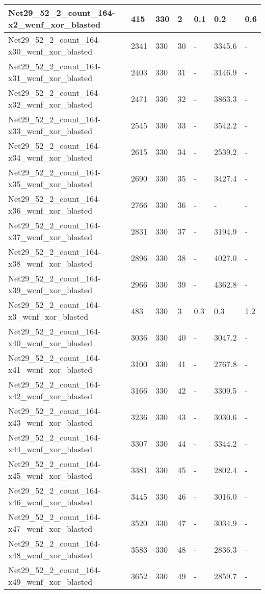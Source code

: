 \begin{scriptsize}
\begin{longtable}{|p{5cm}|l|l|l|l|l|l|}
Net29\_52\_2\_count\_164-x2\_wcnf\_xor\_blasted&415&330&2&0.1&0.2&0.6 \\ \hline 
Net29\_52\_2\_count\_164-x30\_wcnf\_xor\_blasted&2341&330&30&-&3345.6&- \\ \hline 
Net29\_52\_2\_count\_164-x31\_wcnf\_xor\_blasted&2403&330&31&-&3146.9&- \\ \hline 
Net29\_52\_2\_count\_164-x32\_wcnf\_xor\_blasted&2471&330&32&-&3863.3&- \\ \hline 
Net29\_52\_2\_count\_164-x33\_wcnf\_xor\_blasted&2545&330&33&-&3542.2&- \\ \hline 
Net29\_52\_2\_count\_164-x34\_wcnf\_xor\_blasted&2615&330&34&-&2539.2&- \\ \hline 
Net29\_52\_2\_count\_164-x35\_wcnf\_xor\_blasted&2690&330&35&-&3427.4&- \\ \hline 
Net29\_52\_2\_count\_164-x36\_wcnf\_xor\_blasted&2766&330&36&-&-&- \\ \hline 
Net29\_52\_2\_count\_164-x37\_wcnf\_xor\_blasted&2831&330&37&-&3194.9&- \\ \hline 
Net29\_52\_2\_count\_164-x38\_wcnf\_xor\_blasted&2896&330&38&-&4027.0&- \\ \hline 
Net29\_52\_2\_count\_164-x39\_wcnf\_xor\_blasted&2966&330&39&-&4362.8&- \\ \hline 
Net29\_52\_2\_count\_164-x3\_wcnf\_xor\_blasted&483&330&3&0.3&0.3&1.2 \\ \hline 
Net29\_52\_2\_count\_164-x40\_wcnf\_xor\_blasted&3036&330&40&-&3047.2&- \\ \hline 
Net29\_52\_2\_count\_164-x41\_wcnf\_xor\_blasted&3100&330&41&-&2767.8&- \\ \hline 
Net29\_52\_2\_count\_164-x42\_wcnf\_xor\_blasted&3166&330&42&-&3309.5&- \\ \hline 
Net29\_52\_2\_count\_164-x43\_wcnf\_xor\_blasted&3236&330&43&-&3030.6&- \\ \hline 
Net29\_52\_2\_count\_164-x44\_wcnf\_xor\_blasted&3307&330&44&-&3344.2&- \\ \hline 
Net29\_52\_2\_count\_164-x45\_wcnf\_xor\_blasted&3381&330&45&-&2802.4&- \\ \hline 
Net29\_52\_2\_count\_164-x46\_wcnf\_xor\_blasted&3445&330&46&-&3016.0&- \\ \hline 
Net29\_52\_2\_count\_164-x47\_wcnf\_xor\_blasted&3520&330&47&-&3034.9&- \\ \hline 
Net29\_52\_2\_count\_164-x48\_wcnf\_xor\_blasted&3583&330&48&-&2836.3&- \\ \hline 
Net29\_52\_2\_count\_164-x49\_wcnf\_xor\_blasted&3652&330&49&-&2859.7&- \\ \hline 

\end{longtable}
\end{scriptsize}
